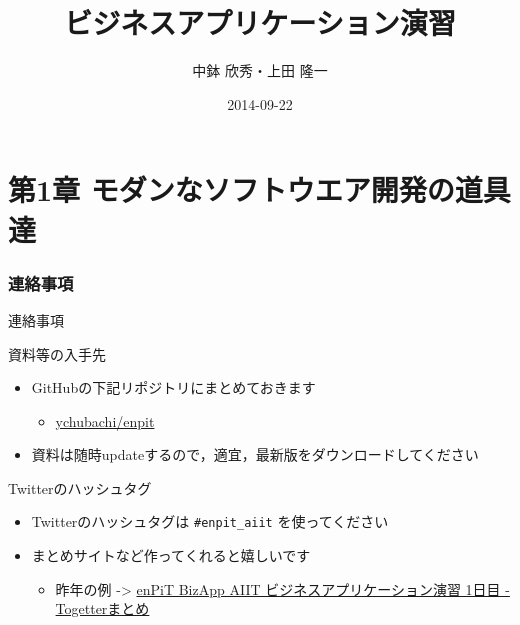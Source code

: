 \documentclass[t, aspectratio=169]{beamer}
\date{\insertpart}
\institute[AIIT]{産業技術大学院大学(AIIT)}
\author{中鉢 欣秀・上田 隆一}
\date{2014-09-22}
\title{ビジネスアプリケーション演習}
\begin{document}
\maketitle


\part{第1章 モダンなソフトウエア開発の道具達}
\label{sec-1}
\section{連絡事項}
\label{sec-1-1}
\begin{frame}[fragile,label=sec-1-1-1]{連絡事項}
 \begin{block}{資料等の入手先}
\begin{itemize}
\item GitHubの下記リポジトリにまとめておきます
\begin{itemize}
\item \href{https://github.com/ychubachi/enpit}{ychubachi/enpit}
\end{itemize}
\item 資料は随時updateするので，適宜，最新版をダウンロードしてください
\end{itemize}
\end{block}
\begin{block}{Twitterのハッシュタグ}
\begin{itemize}
\item Twitterのハッシュタグは \texttt{\#enpit\_aiit} を使ってください
\item まとめサイトなど作ってくれると嬉しいです
\begin{itemize}
\item 昨年の例 -> \href{http://togetter.com/li/558221}{enPiT BizApp AIIT ビジネスアプリケーション演習 1日目 - Togetterまとめ}
\end{itemize}
\end{itemize}
\end{block}
\end{frame}
\end{document}
